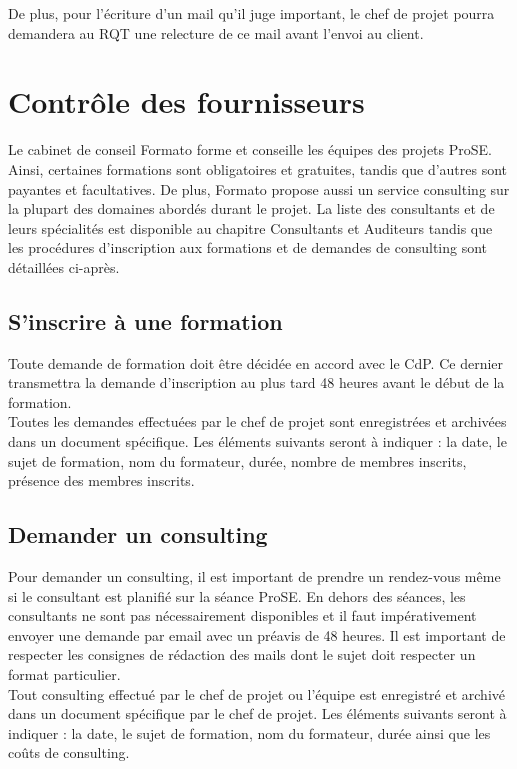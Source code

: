 \documentclass[a4paper,11pt,titlepage]{article}
\begin{document}
De plus, pour l'écriture d'un mail qu'il juge important, le chef de projet 
pourra demandera au RQT une relecture de ce mail avant l'envoi au client.\\

\section{Contrôle des fournisseurs}
Le cabinet de conseil Formato forme et conseille les équipes des projets
ProSE. Ainsi, certaines formations sont obligatoires et gratuites, tandis
que d'autres sont payantes et facultatives. De plus, Formato propose
aussi un service consulting sur la plupart des domaines abordés durant
le projet. La liste des consultants et de leurs spécialités est disponible
au chapitre Consultants et Auditeurs tandis que les procédures d'inscription
aux formations et de demandes de consulting sont détaillées ci-après.

\subsection{S'inscrire à une formation}
Toute demande de formation doit être décidée en accord avec le CdP.
Ce dernier transmettra la demande d'inscription au plus tard 48 heures
avant le début de la formation.\\

Toutes les demandes effectuées par le chef de projet sont enregistrées
et archivées dans un document spécifique. Les éléments suivants seront
à indiquer : la date, le sujet de formation, nom du formateur, durée,
nombre de membres inscrits, présence des membres inscrits.

\subsection{Demander un consulting}
Pour demander un consulting, il est important de prendre un rendez-vous même si le consultant est planifié sur la séance ProSE.
En dehors des séances, les consultants ne sont pas nécessairement disponibles et il faut impérativement envoyer une demande par
email avec un préavis de 48 heures. Il est important de respecter les consignes de rédaction des mails
dont le sujet doit respecter un format particulier. \\

Tout consulting effectué par le chef de projet ou l'équipe est enregistré et
archivé dans un document spécifique par le chef de projet. Les éléments
suivants seront à indiquer : la date, le sujet de formation, nom du formateur,
durée ainsi que les coûts de consulting.
\end{document}
